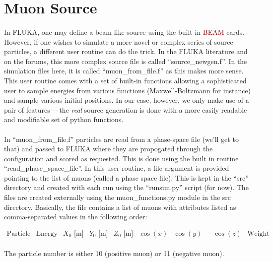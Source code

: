 \section{Muon Source}

\paragraph{}
In FLUKA, one may define a beam-like source using the built-in \textcolor{Maroon}{BEAM} cards. However, if one wishes to simulate a more novel or complex series of source particles, a different user routine can do the trick. In the FLUKA literature and on the forums, this more complex source file is called ``source\_newgen.f''. In the simulation files here, it is called ``muon\_from\_file.f'' as this makes more sense. This user routine comes with a set of built-in functions allowing a sophisticated user to sample energies from various functions (Maxwell-Boltzmann for instance) and sample various initial positions. In our case, however, we only make use of a pair of features— the \textit{real} source generation is done with a more easily readable and modifiable set of python functions. 

\paragraph{}
In ``muon\_from\_file.f'' particles are read from a phase-space file (we'll get to that) and passed to FLUKA where they are propogated through the configuration and scored as requested. This is done using the built in routine ``read\_phase\_space\_file''. In this user routine, a file argument is provided pointing to the list of muons (called a phase space file). This is kept in the ``src'' directory and created with each run using the ``runsim.py'' script (for now). The files are created externally using the muon\_functions.py module in the src directory. Basically, the file contains a list of muons with attributes listed as comma-separated values in the following order:

\[
    \begin{matrix}
        \text{Particle No.} & \text{Energy  [GeV]} & X_0 \text{ [m]} & Y_0 \text{ [m]}& Z_0 \text{ [m]}& \cos(x) & \cos(y) & -\cos(z) & \text{Weight}
    \end{matrix}
\]

\paragraph{}
The particle number is either 10 (positive muon) or 11 (negative muon). 